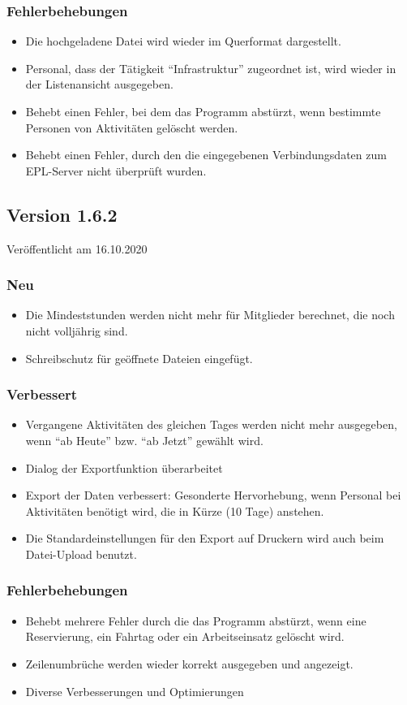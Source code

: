 \subsubsection{Fehlerbehebungen}
\begin{itemize}
  \item
  Die hochgeladene Datei wird wieder im Querformat dargestellt.
  \item
  Personal, dass der Tätigkeit "`Infrastruktur"' zugeordnet ist, wird wieder in der Listenansicht ausgegeben.
  \item
  Behebt einen Fehler, bei dem das Programm abstürzt, wenn bestimmte Personen von Aktivitäten gelöscht werden.
  \item
  Behebt einen Fehler, durch den die eingegebenen Verbindungsdaten zum EPL-Server nicht überprüft wurden.
\end{itemize}

\subsection{Version 1.6.2}
\label{version:1:6:2}
Veröffentlicht am 16.10.2020
\subsubsection{Neu}
\begin{itemize}
  \item Die Mindeststunden werden nicht mehr für Mitglieder berechnet, die noch nicht volljährig sind.
  \item Schreibschutz für geöffnete Dateien eingefügt.
\end{itemize}

\subsubsection{Verbessert}
\begin{itemize}
  \item Vergangene Aktivitäten des gleichen Tages werden nicht mehr ausgegeben, wenn "`ab Heute"' bzw. "`ab Jetzt"' gewählt wird.
  \item Dialog der Exportfunktion überarbeitet
  \item Export der Daten verbessert: Gesonderte Hervorhebung, wenn Personal bei Aktivitäten benötigt wird, die in Kürze (10 Tage) anstehen.
  \item Die Standardeinstellungen für den Export auf Druckern wird auch beim Datei-Upload benutzt.
\end{itemize}

\subsubsection{Fehlerbehebungen}
\begin{itemize}
  \item Behebt mehrere Fehler durch die das Programm abstürzt, wenn eine Reservierung, ein Fahrtag oder ein Arbeitseinsatz gelöscht wird.
  \item Zeilenumbrüche werden wieder korrekt ausgegeben und angezeigt.
  \item Diverse Verbesserungen und Optimierungen
\end{itemize}
